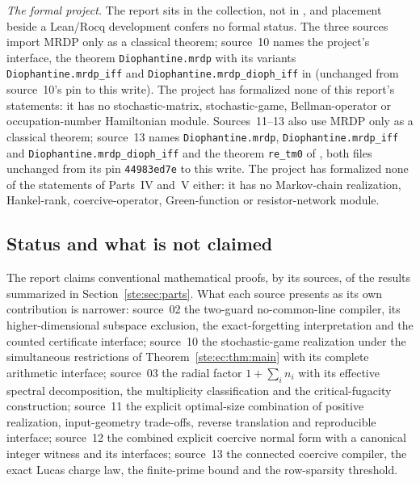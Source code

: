 \documentclass[11pt,letterpaper]{article}
\theoremstyle{definition}
\theoremstyle{remark}
\begin{document}
\emph{The formal project.} The report sits in the collection, not in , and placement beside a Lean/Rocq development confers no formal status. The three sources import MRDP only as a classical theorem; source~10 names the project's interface, the theorem \texttt{Diophantine.mrdp} with its variants \texttt{Diophantine.mrdp\_iff} and \texttt{Diophantine.mrdp\_dioph\_iff} in  (unchanged from source~10's pin to this write). The project has formalized none of this report's statements: it has no stochastic-matrix, stochastic-game, Bellman-operator or occupation-number Hamiltonian module. Sources~11--13 also use MRDP only as a classical theorem; source~13 names \texttt{Diophantine.mrdp}, \texttt{Diophantine.mrdp\_iff} and \texttt{Diophantine.mrdp\_dioph\_iff} and the theorem \texttt{re\_tm0} of , both files unchanged from its pin \texttt{44983ed7e} to this write. The project has formalized none of the statements of Parts~IV and~V either: it has no Markov-chain realization, Hankel-rank, coercive-operator, Green-function or resistor-network module.

\subsection{Status and what is not claimed}\label{ste:sec:status}

The report claims conventional mathematical proofs, by its sources, of the results summarized in Section~\ref{ste:sec:parts}. What each source presents as its own contribution is narrower: source~02 the two-guard no-common-line compiler, its higher-dimensional subspace exclusion, the exact-forgetting interpretation and the counted certificate interface; source~10 the stochastic-game realization under the simultaneous restrictions of Theorem~\ref{ste:ec:thm:main} with its complete arithmetic interface; source~03 the radial factor $1+\sum_in_i$ with its effective spectral decomposition, the multiplicity classification and the critical-fugacity construction; source~11 the explicit optimal-size combination of positive realization, input-geometry trade-offs, reverse translation and reproducible interface; source~12 the combined explicit coercive normal form with a canonical integer witness and its interfaces; source~13 the connected coercive compiler, the exact Lucas charge law, the finite-prime bound and the row-sparsity threshold.
\end{document}
